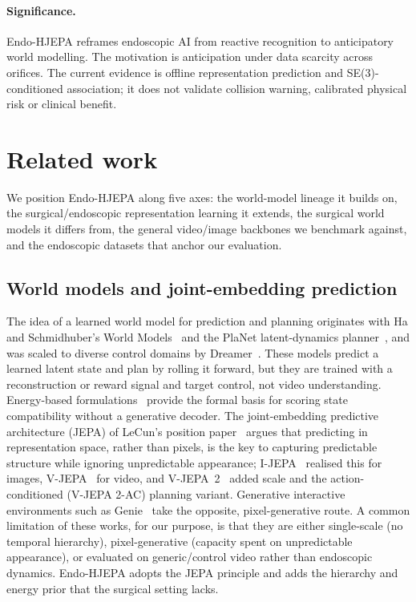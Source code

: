 \documentclass[preprint,12pt]{elsarticle}
\begin{document}
\paragraph{Significance.}
Endo-HJEPA reframes endoscopic AI from reactive recognition to anticipatory world modelling.
The motivation is anticipation under data scarcity across orifices. The
current evidence is offline representation prediction and SE(3)-conditioned
association; it does not validate collision warning, calibrated physical risk
or clinical benefit.

\section{Related work}
We position Endo-HJEPA along five axes: the world-model lineage it builds on, the surgical/endoscopic representation learning it extends, the surgical world models it differs from, the general video/image backbones we benchmark against, and the endoscopic datasets that anchor our evaluation.

\subsection{World models and joint-embedding prediction}
The idea of a learned world model for prediction and planning originates with Ha and Schmidhuber's World Models~\cite{ha2018worldmodels} and the PlaNet latent-dynamics planner~\cite{hafner2019planet}, and was scaled to diverse control domains by Dreamer~\cite{hafner2023dreamer}. These models predict a learned latent state and plan by rolling it forward, but they are trained with a reconstruction or reward signal and target control, not video understanding. Energy-based formulations~\cite{lecun2006ebm} provide the formal basis for scoring state compatibility without a generative decoder. The joint-embedding predictive architecture (JEPA) of LeCun's position paper~\cite{lecun2022path} argues that predicting in representation space, rather than pixels, is the key to capturing predictable structure while ignoring unpredictable appearance; I-JEPA~\cite{assran2023ijepa} realised this for images, V-JEPA~\cite{bardes2024vjepa} for video, and V-JEPA~2~\cite{assran2025vjepa2} added scale and the action-conditioned (V-JEPA 2-AC) planning variant. Generative interactive environments such as Genie~\cite{genie2024} take the opposite, pixel-generative route. A common limitation of these works, for our purpose, is that they are either single-scale (no temporal hierarchy), pixel-generative (capacity spent on unpredictable appearance), or evaluated on generic/control video rather than endoscopic dynamics. Endo-HJEPA adopts the JEPA principle and adds the hierarchy and energy prior that the surgical setting lacks.
\end{document}
